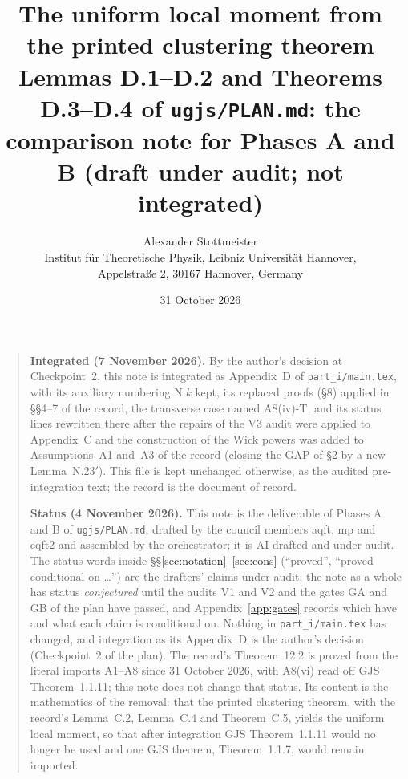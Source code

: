 

\title{The uniform local moment from the printed clustering theorem\\[4pt]
\large Lemmas D.1--D.2 and Theorems D.3--D.4 of \texttt{ugjs/PLAN.md}: the comparison note
for Phases A and B (draft under audit; not integrated)}
\author{Alexander Stottmeister\\[3pt]
  \normalsize Institut f\"ur Theoretische Physik, Leibniz Universit\"at Hannover,\\
  \normalsize Appelstra\ss e 2, 30167 Hannover, Germany}
\date{31 October 2026}


\maketitle

\begin{quote}\small
\textbf{Integrated (7 November 2026).} By the author's decision at Checkpoint~2, this note is
integrated as Appendix~D of \texttt{part\_i/main.tex}, with its auxiliary numbering N.$k$
kept, its replaced proofs (\S8) applied in \S\S4--7 of the record, the transverse case named
A8(iv)-T, and its status lines rewritten there after the repairs of the V3 audit were applied
to Appendix~C and the construction of the Wick powers was added to Assumptions~A1 and~A3 of
the record (closing the GAP of \S2 by a new Lemma~N.23$'$).  This file is kept unchanged
otherwise, as the audited pre-integration text; the record is the document of record.

\smallskip
\textbf{Status (4 November 2026).} This note is the deliverable of Phases A and B of
\texttt{ugjs/PLAN.md}, drafted by the council members aqft, mp and cqft2 and assembled by the
orchestrator; it is AI-drafted and under audit. The status words inside
\S\S\ref{sec:notation}--\ref{sec:cons} (``proved'', ``proved conditional on \dots'') are the
drafters' claims under audit; the note as a whole has status \emph{conjectured} until the
audits V1 and V2 and the gates GA and GB of the plan have passed, and Appendix~\ref{app:gates}
records which have and what each claim is conditional on. Nothing in \texttt{part\_i/main.tex} has changed,
and integration as its Appendix~D is the author's decision (Checkpoint~2 of the plan). The
record's Theorem~12.2 is proved from the literal imports A1--A8 since 31 October 2026, with
A8(vi) read off GJS Theorem~1.1.11; this note does not change that status. Its content is the
mathematics of the removal: that the printed clustering theorem, with the record's Lemma~C.2,
Lemma~C.4 and Theorem~C.5, yields the uniform local moment, so that after integration GJS
Theorem~1.1.11 would no longer be used and one GJS theorem, Theorem~1.1.7, would remain imported.
\end{quote}

